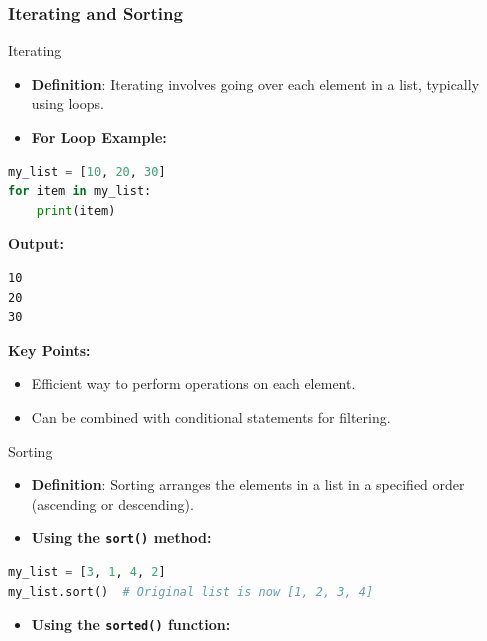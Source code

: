 \documentclass{beamer}
\begin{document}
\begin{frame}[fragile]
    \frametitle{Iterating and Sorting}
    
    \begin{block}{Iterating}
        \begin{itemize}
            \item \textbf{Definition}: Iterating involves going over each element in a list, typically using loops.
            \item \textbf{For Loop Example:}
        \end{itemize}
        
        \begin{lstlisting}[language=Python]
my_list = [10, 20, 30]
for item in my_list:
    print(item)
        \end{lstlisting}
        
        \textbf{Output:}
        \begin{verbatim}
10
20
30
        \end{verbatim}

        \textbf{Key Points:}
        \begin{itemize}
            \item Efficient way to perform operations on each element.
            \item Can be combined with conditional statements for filtering.
        \end{itemize}
    \end{block}
    
    \begin{block}{Sorting}
        \begin{itemize}
            \item \textbf{Definition}: Sorting arranges the elements in a list in a specified order (ascending or descending).
            \item \textbf{Using the \texttt{sort()} method:}
        \end{itemize}
        
        \begin{lstlisting}[language=Python]
my_list = [3, 1, 4, 2]
my_list.sort()  # Original list is now [1, 2, 3, 4]
        \end{lstlisting}

        \begin{itemize}
            \item \textbf{Using the \texttt{sorted()} function:}
        \end{itemize}
        

\end{block}
\end{frame}
\end{document}
